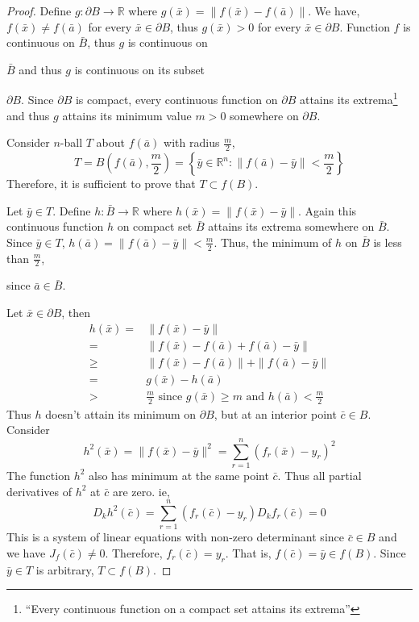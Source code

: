 \begin{proof}
Define $g : \partial B \to \mathbb{R}$ where $g(\bar{x}) = \| f(\bar{x}) - f(\bar{a}) \| $.
We have, $f(\bar{x}) \ne f(\bar{a})$ for every $\bar{x} \in \partial B$, thus $g(\bar{x}) > 0$ for every $\bar{x} \in \partial B$.
Function $f$ is continuous on $\bar{B}$, thus $g$ is continuous on \begin{commentary}$\bar{B}$ and thus $g$ is continuous on its subset\end{commentary} $\partial B$.
Since $\partial B$ is compact, every continuous function on $\partial B$ attains its extrema\footnote{``Every continuous function on a compact set attains its extrema''} and thus $g$ attains its minimum value $m > 0$ somewhere on $\partial B$.

Consider $n$-ball $T$ about $f(\bar{a})$ with radius $\frac{m}{2}$, 
\[ T = B\left(f(\bar{a}),\frac{m}{2}\right) = \left\{ \bar{y} \in \mathbb{R}^n : \| f(\bar{a}) - \bar{y}\| < \frac{m}{2} \right\} \]
Therefore, it is sufficient to prove that $T \subset f(B)$.

Let $\bar{y} \in T$. Define $h : \bar{B} \to \mathbb{R}$ where $h(\bar{x}) = \| f(\bar{x}) - \bar{y} \|$. Again this continuous function $h$ on compact set $\bar{B}$ attains its extrema somewhere on $\bar{B}$. Since $\bar{y} \in T$, $h(\bar{a}) = \| f(\bar{a}) - \bar{y} \| < \frac{m}{2} $. Thus, the minimum of $h$ on $\bar{B}$ is less than $\frac{m}{2}$, \begin{commentary}since $\bar{a} \in \bar{B}$.\end{commentary}

Let $\bar{x} \in \partial B$, then 
\begin{align*}
	h(\bar{x}) = & \| f(\bar{x}) - \bar{y} \| \\
	= &  \| f(\bar{x}) - f(\bar{a}) + f(\bar{a}) - \bar{y} \| \\
	\ge &  \| f(\bar{x}) - f(\bar{a})\| + \| f(\bar{a}) - \bar{y} \| \\ 
	= &  g(\bar{x}) - h(\bar{a}) \\
	> & \frac{m}{2} \text{ since $g(\bar{x}) \ge m$ and $h(\bar{a}) < \frac{m}{2}$}
\end{align*}
	Thus $h$ doesn't attain its minimum on $\partial B$, but at an interior point $\bar{c} \in B$. Consider
	\[ h^2(\bar{x}) = \| f(\bar{x}) - \bar{y}\|^2 = \sum_{r = 1}^n (f_r(\bar{x}) - y_r)^2 \]
	The function $h^2$ also has minimum at the same point $\bar{c}$. Thus all partial derivatives of $h^2$ at $\bar{c}$ are zero. ie, 
	\[ D_k h^2(\bar{c}) = \sum_{r = 1}^n (f_r(\bar{c})-y_r)D_kf_r(\bar{c}) = 0 \]
	This is a system of linear equations with non-zero determinant since $\bar{c} \in B$ and we have $J_f(\bar{c}) \ne 0$. Therefore, $f_r(\bar{c}) = y_r$. That is, $f(\bar{c}) = \bar{y} \in f(B)$. Since $\bar{y} \in T$ is arbitrary, $T \subset f(B)$.
\end{proof}

